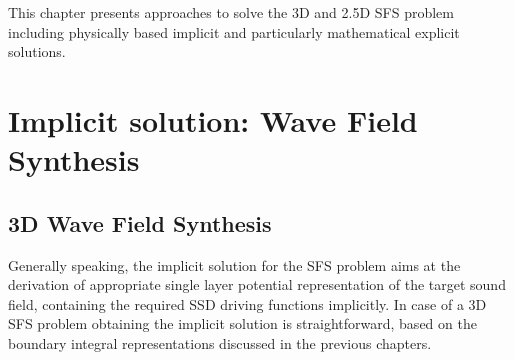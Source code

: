 This chapter presents approaches to solve the 3D and 2.5D SFS problem including physically based implicit and particularly mathematical explicit solutions. 




\section{Implicit solution: Wave Field Synthesis}

\subsection{3D Wave Field Synthesis}

Generally speaking, the implicit solution for the SFS problem aims at the derivation of appropriate single layer potential representation of the target sound field, containing the required SSD driving functions implicitly.
In case of a 3D SFS problem obtaining the implicit solution is straightforward, based on the boundary integral representations discussed in the previous chapters.

